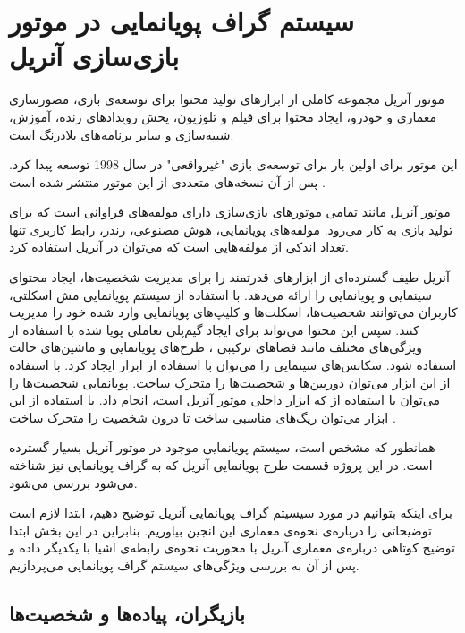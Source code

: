 \chapter {سیستم گراف پویانمایی در موتور بازی‌سازی آنریل}

موتور آنریل مجموعه کاملی از ابزار‌های تولید محتوا برای توسعه‌ی بازی، مصورسازی معماری و خودرو، 
ایجاد محتوا برای فیلم و تلوزیون،
پخش رویداد‌های زنده، آموزش، شبیه‌سازی 
و سایر برنامه‌های بلادرنگ است.

این موتور برای اولین بار برای توسعه‌ی بازی "غیرواقعی" در سال 1998 توسعه پیدا کرد.
پس از آن نسخه‌های متعددی از این موتور منتشر شده است \cite{UnrealEngineWikiPedia}.

موتور آنریل مانند تمامی موتور‌های بازی‌سازی دارای مولفه‌های فراوانی است که برای 
تولید بازی به کار می‌رود.
مولفه‌های پویانمایی، هوش مصنوعی، رندر، رابط کاربری تنها تعداد اندکی از مولفه‌هایی است که ‌می‌توان در 
آنریل استفاده کرد.

آنریل طیف گسترده‌ای از ابزار‌های قدرتمند را برای مدیریت شخصیت‌ها، ایجاد محتوای سینمایی 
و پویانمایی را ارائه می‌دهد.
با استفاده از سیستم پویانمایی مش اسکلتی، 
کاربران می‌توانند شخصیت‌ها، اسکلت‌ها و کلیپ‌های پویانمایی 
وارد شده خود را مدیریت کنند.
سپس این محتوا می‌تواند برای ایجاد گیم‌پلی تعاملی پویا شده با استفاده از 
ویژگی‌های مختلف مانند 
فضا‌های ترکیبی 
، طرح‌های پویانمایی 
و ماشین‌های حالت 
استفاده شود.
سکانس‌های سینمایی را می‌توان با استفاده از ابزار 
ایجاد کرد. با استفاده از این ابزار می‌توان 
دوربین‌ها و شخصیت‌ها را متحرک ساخت.
پویانمایی شخصیت‌ها را می‌توان با استفاده از 
که ابزار داخلی 
موتور آنریل است، انجام داد.
با استفاده از این ابزار می‌توان ریگ‌های مناسبی ساخت تا 
درون 
شخصیت را متحرک ساخت \cite{UnrealEngineAnimation}.

همانطور که مشخص است، سیستم پویانمایی موجود در موتور آنریل بسیار گسترده است. در این پروژه 
قسمت طرح پویانمایی آنریل که به گراف پویانمایی نیز شناخته می‌شود بررسی می‌شود.

برای اینکه بتوانیم در مورد سیسیتم گراف پویانمایی آنریل توضیح دهیم، ابتدا لازم است 
توضیحاتی را درباره‌ی نحوه‌ی معماری این انجین بیاوریم. بنابراین در این بخش ابتدا توضیح کوتاهی 
درباره‌ی معماری آنریل با محوریت نحوه‌ی رابطه‌‌ی اشیا با یکدیگر داده و 
پس از آن به بررسی ویژگی‌های سیستم گراف پویانمایی می‌پردازیم.

 
\section{بازیگران، پیاده‌ها و شخصیت‌‌ها}

